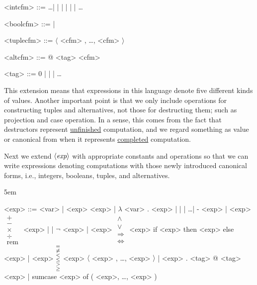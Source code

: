 \begin{enumcirc}
\begin{center}
\begin{minipage}{0.4\textwidth}
\begin{grammar}
				<intcfm> ::= \dots \;| \;| \;| \;| \;| \;|\; \dots

				<boolcfm> ::= \true \;|\; \false

				<tuplecfm> ::= $\langle$ <cfm> , \dots , <cfm> $\rangle$

				<altcfm> ::= @ <tag> <cfm>

				<tag> ::= 0 \;| \;| \;|\; \dots
			\end{grammar}
		\end{minipage}
	\end{center}
	This extension means that expressions in this language denote five different
	kinds of values.
	Another important point is that we only include operations for constructing
	tuples and alternatives, not those for destructing them;
	such as projection and case operation.
	In a sense, this comes from the fact that destructors represent \ul{unfinished}
	computation, and we regard something as value or canonical from when it
	represents \ul{completed} computation.
	\item
	Next we extend $\gram{exp}$ with appropriate constants and operations so that
	we can write expressions denoting computations with those newly introduced
	canonical forms, i.e., integers, booleans, tuples, and alternatives.
	\begin{center}
		\begin{minipage}{0.8\textwidth}
			\grammarindent5em
			\begin{grammar}
				<exp> ::= <var> \;| \;|\; $\lambda$ <var> . <exp>
				 \;| \;| \;|\; \dots \;|\; - <exp> \;|\; <exp> $\substack{+\\-\\\times\\\div\\\textrm{rem}}$ <exp>
				\alt \true \;|\; \false \;|\; $\neg$ <exp> \;|\; <exp> $\substack{\wedge\\\vee\\\Rightarrow\\\Leftrightarrow}$ <exp>
				\alt if <exp> then <exp> else <exp> \;|\; <exp> $\substack{=\\\ne\\\textrm{\textless}\\\le\\\textrm{\textgreater}\\\ge}$ <exp>
				\alt $\langle$ <exp> , \dots , <exp> $\rangle$ \footnotemark \;|\; <exp> . <tag> \footnotemark
				\alt @ <tag> <exp> \footnotemark \;|\; sumcase <exp> of ( <exp>, \dots , <exp> ) \footnotemark

\end{grammar}
\end{minipage}
\end{center}
\end{enumcirc}
